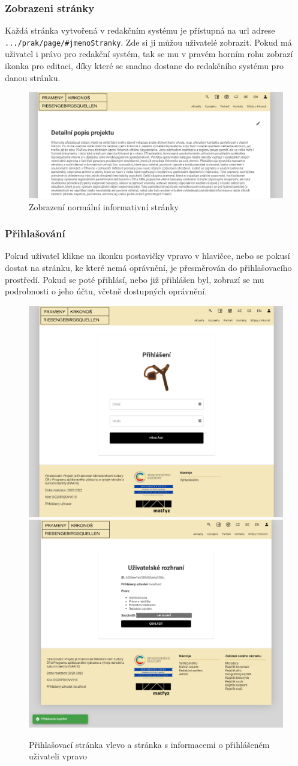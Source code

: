 \subsubsection{Zobrazeni stránky}
Každá stránka vytvořená v redakčním systému je přístupná na url adrese \texttt{.../prak/page/\#jmenoStranky}.
Zde si ji můžou uživatelé zobrazit. Pokud má uživatel i právo pro redakční systém,
tak se mu v pravém horním rohu zobrazí ikonka pro editaci, díky které se snadno dostane do
redakčního systému pro danou stránku.
\begin{figure}[H]
	\centering
	\includegraphics[width=.8\linewidth]{img/pageScene.png}
	\caption{Zobrazení normální informativní stránky}
\end{figure}

\subsubsection{Přihlašování}
Pokud uživatel klikne na ikonku postavičky vpravo v hlavičce, nebo se pokusí dostat
na stránku, ke které nemá oprávnění, je přesměrován do přihlašovacího prostředí.
Pokud se poté přihlásí, nebo již přihlášen byl, zobrazí se mu podrobnosti o jeho účtu,
včetně dostupných oprávnění.\\
\begin{figure}[H]
	\centering
	\includegraphics[width=.49\linewidth]{img/loginSceneB.png}
	\includegraphics[width=.5\linewidth]{img/loginSceneA.png}
	\caption{Přihlašovací stránka vlevo a stránka s informacemi o přihlášeném uživateli vpravo}
\end{figure}

